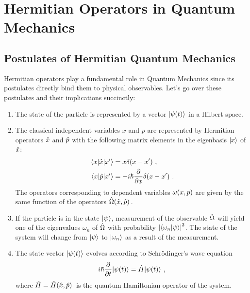 \chapter{Hermitian Operators in Quantum Mechanics}\label{ch:hermiticity}
    \section{Postulates of Hermitian Quantum Mechanics}
        Hermitian operators play a fundamental role in Quantum Mechanics since its postulates directly bind them to physical observables. Let's go over these postulates \cite{Shankar2012-kg} and their implications \cite{Shankar2012-kg,Sakurai2020-pu} succinctly:
        \begin{enumerate}[label=\Roman*.] 
            \item The state of the particle is represented by a vector $\ket{\psi\pqty{t}}$ in a Hilbert space.
            \item The classical independent variables $x$ and $p$ are represented by Hermitian operators $\hat{x}$ and $\hat{p}$ with the following matrix elements in the eigenbasis $\ket{x}$ of $\hat{x}$:
            \begin{align*}
                \mel*{x}{\hx}{x'} &= x\delta\pqty*{x-x'} \mycomma \\
                \mel*{x}{\hp}{x'} &= -i\hbar\pdv{x}\delta\pqty*{x-x'} \myperiod
            \end{align*}
            The operators corresponding to dependent variables $\omega\pqty{x,p}$ are given by the same function of the operators $\togglehat{\Omega}\pqty*{\hx,\hp}$.
            \item If the particle is in the state $\ket{\psi}$, measurement of the observable $\hat{\Omega}$ will yield one of the eigenvalues $\omega_n$ of $\hat{\Omega}$ with probability $\abs{\braket{\omega_n}{\psi}}^2$. The state of the system will change from $\ket{\psi}$ to $\ket{\omega_n}$ as a result of the measurement.
            \item The state vector $\ket{\psi\pqty{t}}$ evolves according to Schr\"odinger's wave equation
            \begin{equation}
                i\hbar\pdv{t}\!\ket{\psi\pqty{t}} = \hH\!\ket{\psi\pqty{t}}
                \mycomma
                \label{eq:schrodinger}
            \end{equation}
            where $\hH = \hH\pqty*{\hx,\hp}$ is the quantum Hamiltonian operator of the system.
        \end{enumerate}

